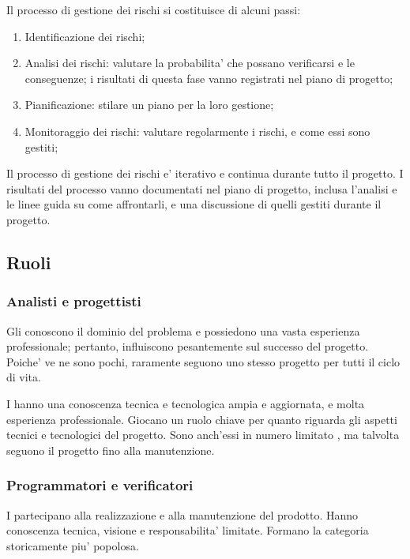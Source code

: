 Il processo di gestione dei rischi si costituisce di alcuni passi:

\begin{enumerate}
  \item Identificazione dei rischi;
  \item Analisi dei rischi: valutare la probabilita' che possano verificarsi e
    le conseguenze; i risultati di questa fase vanno registrati nel piano di
    progetto;
  \item Pianificazione: stilare un piano per la loro gestione;
  \item Monitoraggio dei rischi: valutare regolarmente i rischi, e come essi
    sono gestiti;
\end{enumerate}

Il processo di gestione dei rischi e' iterativo e continua durante tutto il
progetto. I risultati del processo vanno documentati nel piano di progetto,
inclusa l'analisi e le linee guida su come affrontarli, e una discussione di
quelli gestiti durante il progetto.

\subsection{Ruoli}


\subsubsection{Analisti e progettisti}

Gli  conoscono il dominio del problema e possiedono una vasta
esperienza professionale; pertanto, influiscono pesantemente sul successo del
progetto. Poiche' ve ne sono pochi, raramente seguono uno stesso progetto per
tutti il ciclo di vita. 

I  hanno una conoscenza tecnica e tecnologica ampia e
aggiornata, e molta esperienza professionale. Giocano un ruolo chiave per quanto
riguarda gli aspetti tecnici e tecnologici del progetto. Sono anch'essi in
numero limitato , ma talvolta seguono il progetto fino alla
manutenzione.

\subsubsection{Programmatori e verificatori}

I  partecipano alla realizzazione e alla manutenzione del
prodotto. Hanno conoscenza tecnica, visione e responsabilita' limitate. Formano
la categoria storicamente piu' popolosa.

